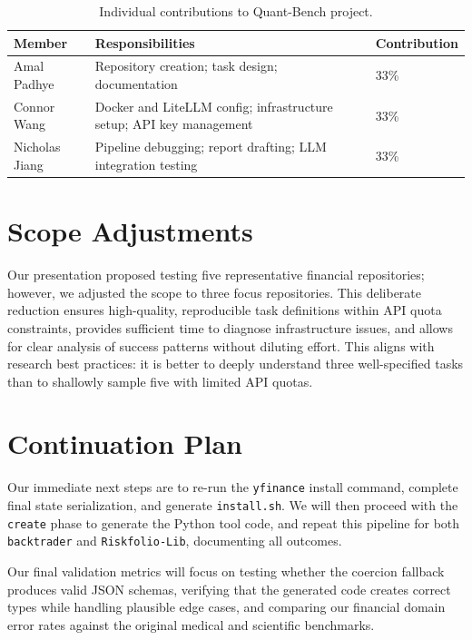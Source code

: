 \documentclass[11pt]{article}
\begin{document}
\begin{table}[H]
  \centering
  \small %
  \begin{tabular}{l p{3.5cm} l}
    \hline
    \textbf{Member} & \textbf{Responsibilities} & \textbf{Contribution} \\
    \hline
    Amal Padhye & Repository creation; task design; documentation& 33\% \\
    Connor Wang & Docker and LiteLLM config; infrastructure setup; API key management& 33\% \\
    Nicholas Jiang & Pipeline debugging; report drafting; LLM integration testing & 33\% \\
    \hline
  \end{tabular}
  \caption{Individual contributions to Quant-Bench project.}
  \label{tab:contributions}
\end{table}
\vspace{1em}

\section{Scope Adjustments}
Our presentation proposed testing five representative financial repositories; however, we adjusted the scope to three focus repositories. This deliberate reduction ensures high-quality, reproducible task definitions within API quota constraints, provides sufficient time to diagnose infrastructure issues, and allows for clear analysis of success patterns without diluting effort. This aligns with research best practices: it is better to deeply understand three well-specified tasks than to shallowly sample five with limited API quotas.

\section{Continuation Plan}
Our immediate next steps are to re-run the \texttt{yfinance} install command, complete final state serialization, and generate \texttt{install.sh}. We will then proceed with the \texttt{create} phase to generate the Python tool code, and repeat this pipeline for both \texttt{backtrader} and \texttt{Riskfolio-Lib}, documenting all outcomes. 

Our final validation metrics will focus on testing whether the coercion fallback produces valid JSON schemas, verifying that the generated code creates correct types while handling plausible edge cases, and comparing our financial domain error rates against the original medical and scientific benchmarks.
\end{document}
